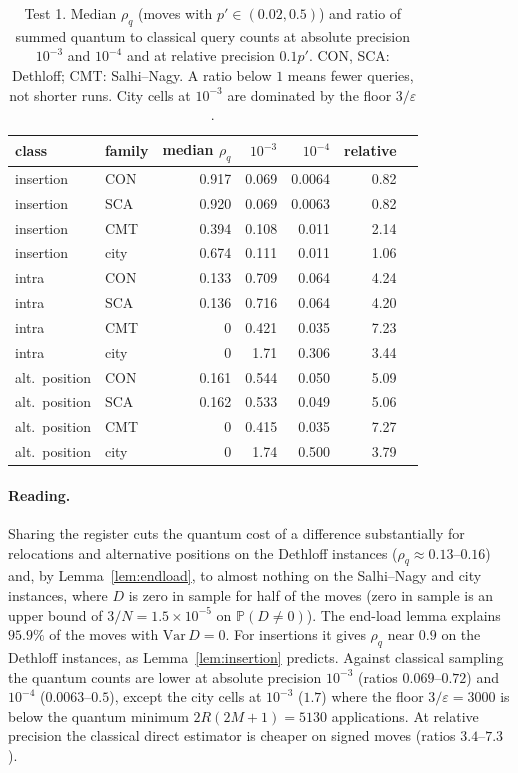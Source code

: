 \documentclass[pdflatex,sn-mathphys-num]{sn-jnl}
\theoremstyle{thmstyleone}
\theoremstyle{thmstyletwo}
\renewcommand{\P}{\mathbb{P}}
\begin{document}
\begin{table}[t]
\caption{Test 1. Median $\rho_q$ (moves with $p'\in(0.02,0.5)$) and ratio of summed quantum to classical query counts at absolute precision $10^{-3}$ and $10^{-4}$ and at relative precision $0.1p'$. CON, SCA: Dethloff; CMT: Salhi--Nagy. A ratio below $1$ means fewer queries, not shorter runs. City cells at $10^{-3}$ are dominated by the floor $3/\varepsilon$.}\label{tab:crn}
\begin{tabular}{@{}llrrrrr@{}}
\toprule
class & family & median $\rho_q$ & $10^{-3}$ & $10^{-4}$ & relative \\
\midrule
insertion & CON & 0.917 & 0.069 & 0.0064 & 0.82 \\
insertion & SCA & 0.920 & 0.069 & 0.0063 & 0.82 \\
insertion & CMT & 0.394 & 0.108 & 0.011 & 2.14 \\
insertion & city & 0.674 & 0.111 & 0.011 & 1.06 \\
intra & CON & 0.133 & 0.709 & 0.064 & 4.24 \\
intra & SCA & 0.136 & 0.716 & 0.064 & 4.20 \\
intra & CMT & 0 & 0.421 & 0.035 & 7.23 \\
intra & city & 0 & 1.71 & 0.306 & 3.44 \\
alt.\ position & CON & 0.161 & 0.544 & 0.050 & 5.09 \\
alt.\ position & SCA & 0.162 & 0.533 & 0.049 & 5.06 \\
alt.\ position & CMT & 0 & 0.415 & 0.035 & 7.27 \\
alt.\ position & city & 0 & 1.74 & 0.500 & 3.79 \\
\bottomrule
\end{tabular}
\end{table}

\paragraph{Reading.} Sharing the register cuts the quantum cost of a difference substantially for relocations and alternative positions on the Dethloff instances ($\rho_q\approx0.13$--$0.16$) and, by Lemma~\ref{lem:endload}, to almost nothing on the Salhi--Nagy and city instances, where $D$ is zero in sample for half of the moves (zero in sample is an upper bound of $3/N=1.5\times10^{-5}$ on $\P(D\neq0)$). The end-load lemma explains $95.9\%$ of the moves with $\mathrm{Var}\,D=0$. For insertions it gives $\rho_q$ near $0.9$ on the Dethloff instances, as Lemma~\ref{lem:insertion} predicts. Against classical sampling the quantum counts are lower at absolute precision $10^{-3}$ (ratios $0.069$--$0.72$) and $10^{-4}$ ($0.0063$--$0.5$), except the city cells at $10^{-3}$ ($1.7$) where the floor $3/\varepsilon=3000$ is below the quantum minimum $2R(2M+1)=5130$ applications. At relative precision the classical direct estimator is cheaper on signed moves (ratios $3.4$--$7.3$).
\end{document}
